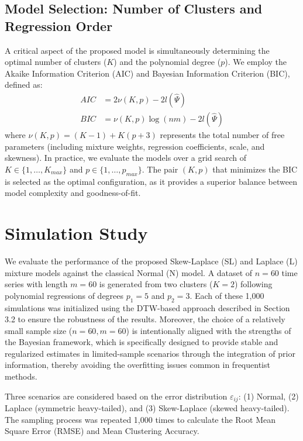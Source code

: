 \documentclass[twoside]{article}
\begin{document}
\subsection{Model Selection: Number of Clusters and Regression Order}
A critical aspect of the proposed model is simultaneously determining the optimal number of clusters ($K$) and the polynomial degree ($p$). We employ the Akaike Information Criterion (AIC) and Bayesian Information Criterion (BIC), defined as:
\begin{align*}
AIC &= 2\nu(K, p) - 2l(\hat{\Psi}) \\
BIC &= \nu(K, p) \log(nm) - 2l(\hat{\Psi})
\end{align*}
where $\nu(K, p) = (K - 1) + K(p + 3)$ represents the total number of free parameters (including mixture weights, regression coefficients, scale, and skewness). In practice, we evaluate the models over a grid search of $K \in \{1, \dots, K_{max}\}$ and $p \in \{1, \dots, p_{max}\}$. The pair $(K, p)$ that minimizes the BIC is selected as the optimal configuration, as it provides a superior balance between model complexity and goodness-of-fit.

\section{Simulation Study}
We evaluate the performance of the proposed Skew-Laplace (SL) and Laplace (L) mixture models against the classical Normal (N) model. A dataset of $n=60$ time series with length $m=60$ is generated from two clusters ($K=2$) following polynomial regressions of degrees $p_1=5$ and $p_2=3$. Each of these 1,000 simulations was initialized using the DTW-based approach described in Section 3.2 to ensure the robustness of the results. Moreover, the choice of a relatively small sample size ($n=60, m=60$) is intentionally aligned with the strengths of the Bayesian framework, which is specifically designed to provide stable and regularized estimates in limited-sample scenarios through the integration of prior information, thereby avoiding the overfitting issues common in frequentist methods.

Three scenarios are considered based on the error distribution $\varepsilon_{ij}$: (1) Normal, (2) Laplace (symmetric heavy-tailed), and (3) Skew-Laplace (skewed heavy-tailed). The sampling process was repeated 1,000 times to calculate the Root Mean Square Error (RMSE) and Mean Clustering Accuracy.
\end{document}
